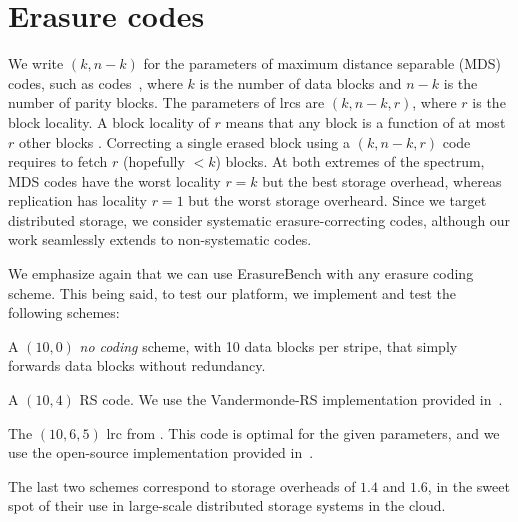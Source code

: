 \section{Erasure codes}

\label{sec:codes}

We write $(k,n-k)$ for the parameters of maximum distance separable (MDS) codes, such as  codes~\autocite{reed-solomon}, where $k$ is the number of data blocks and $n-k$ is the number of parity blocks. The parameters of \acp{lrc} are  $(k,n-k,r)$, where $r$ is the block locality. A block locality of $r$ means that any block is a function of at most $r$ other blocks \autocite{XorbasVLDB}. Correcting a single erased block using a $(k,n-k,r)$ code requires to fetch $r$ (hopefully $<k$) blocks. At both extremes of the spectrum, MDS codes have the worst locality $r=k$ but the best storage overhead, whereas replication has locality $r=1$ but the worst storage overheard. Since we target distributed storage, we consider systematic erasure-correcting codes, although our work seamlessly extends to non-systematic codes. %

We emphasize again that we can use ErasureBench with any erasure coding scheme. This being said, to test our platform, we implement and test the following schemes:
\begin{description}[\IEEEsetlabelwidth{NO EC}]
\item[\textbf{No EC}] A $(10,0)$ \emph{no coding} scheme, with 10 data blocks per stripe, that simply forwards data blocks without redundancy. %
\item[\textbf{\acs{rs}}] A $(10,4)$ RS code. We use the Vandermonde-RS implementation provided in~\autocite{XorbasVLDB}.  
\item[\textbf{\acs{lrc}}] The $(10,6,5)$ \acs{lrc} from \autocite{XorbasVLDB}. This code is optimal for the given parameters, and we use the open-source implementation provided in~\autocite{XorbasVLDB}.
\end{description}
The last two schemes correspond to storage overheads of $1.4$ and $1.6$, in the sweet spot of their use in large-scale distributed storage systems in the cloud.
